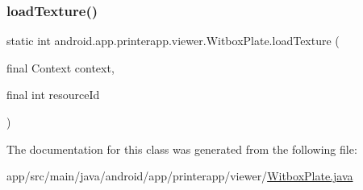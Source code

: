 \subsubsection{\texorpdfstring{load\+Texture()}{loadTexture()}}
{\footnotesize\ttfamily static int android.\+app.\+printerapp.\+viewer.\+Witbox\+Plate.\+load\+Texture (\begin{DoxyParamCaption}\item[{final Context}]{context,  }\item[{final int}]{resource\+Id }\end{DoxyParamCaption})\hspace{0.3cm}{\ttfamily [static]}}



The documentation for this class was generated from the following file\+:\begin{DoxyCompactItemize}
\item 
app/src/main/java/android/app/printerapp/viewer/\hyperlink{_witbox_plate_8java}{Witbox\+Plate.\+java}\end{DoxyCompactItemize}
